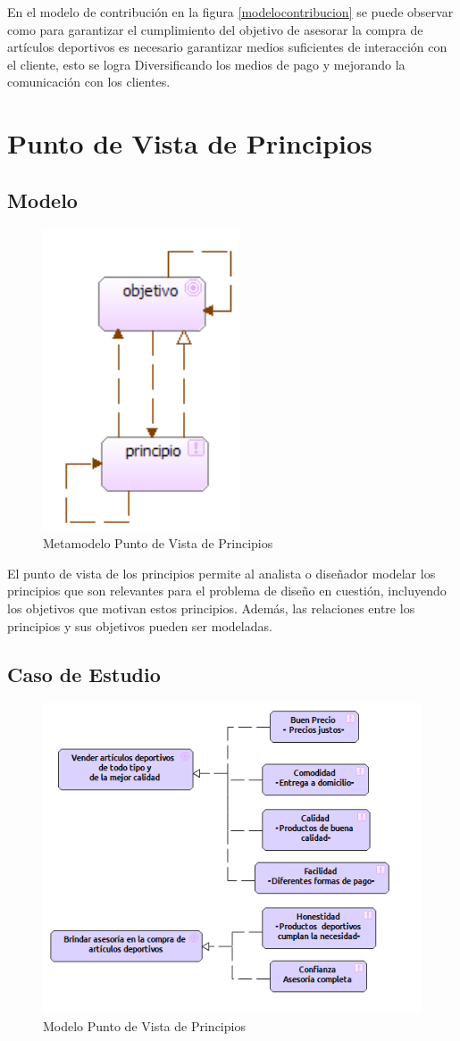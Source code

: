 En el modelo de contribución en la figura \ref{modelocontribucion} se puede observar como para garantizar el cumplimiento del objetivo de asesorar la compra de artículos deportivos es necesario garantizar medios suficientes de interacción con el cliente, esto se logra Diversificando los medios de pago y mejorando la comunicación con los clientes.

\newpage

\section{Punto de Vista de Principios}

\subsection{Modelo}

\begin{figure}[th!]
	\centering
	\includegraphics[width=0.3\linewidth]{arquitectura/imagenes/modeloPrincipios}
	\caption{Metamodelo Punto de Vista de Principios}
	\label{metamodelo principios}
\end{figure}
El punto de vista de los principios permite al analista o diseñador modelar los principios que son relevantes para el problema de diseño en cuestión, incluyendo los objetivos que motivan estos principios. Además, las relaciones entre los principios y sus objetivos pueden ser modeladas. 

\subsection{Caso de Estudio}
\begin{figure}[th!]
	\centering
	\includegraphics[width=0.4\linewidth]{arquitectura/imagenes/PuntoVistaPrincipios}
	\caption{Modelo Punto de Vista de Principios}
	\label{modelo principios}
\end{figure}

